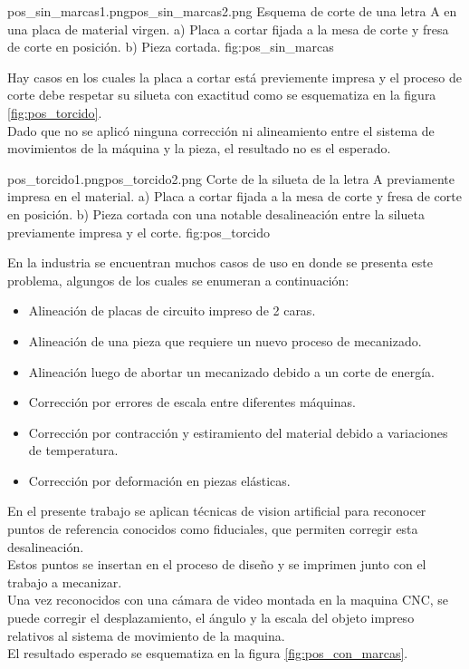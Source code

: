          {pos_sin_marcas1.png}{pos_sin_marcas2.png}
         {Esquema de corte de una letra A en una placa de material virgen. a) Placa a cortar fijada a la mesa de corte y fresa de corte en posición. b) Pieza cortada.}
         {fig:pos_sin_marcas}

         Hay casos en los cuales la placa a cortar está previemente impresa y el proceso de corte debe respetar su silueta con exactitud como se esquematiza en la figura \ref{fig:pos_torcido}. \\
         Dado que no se aplicó ninguna corrección ni alineamiento entre el sistema de movimientos de la máquina y la pieza, el resultado no es el esperado.

         {pos_torcido1.png}{pos_torcido2.png}
         {Corte de la silueta de la letra A previamente impresa en el material. a) Placa a cortar fijada a la mesa de corte y fresa de corte en posición. b) Pieza cortada con una notable desalineación entre la silueta previamente impresa y el corte.}
         {fig:pos_torcido}

         En la industria se encuentran muchos casos de uso en donde se presenta este problema, algungos de los cuales se enumeran a continuación:
\begin{itemize}
   \item{Alineación de placas de circuito impreso de 2 caras.}
   \item{Alineación de una pieza que requiere un nuevo proceso de mecanizado.}
   \item{Alineación luego de abortar un mecanizado debido a un corte de energía.}
   \item{Corrección por errores de escala entre diferentes máquinas.}
   \item{Corrección por contracción y estiramiento del material debido a variaciones de temperatura.}
   \item{Corrección por deformación en piezas elásticas.}
\end{itemize}

         En el presente trabajo se aplican técnicas de vision artificial para reconocer puntos de referencia conocidos como fiduciales, que permiten corregir esta desalineación. \\
         Estos puntos se insertan en el proceso de diseño y se imprimen junto con el trabajo a mecanizar.\\ 
         Una vez reconocidos con una cámara de video montada en la maquina CNC, se puede corregir el desplazamiento, el ángulo y la escala del objeto impreso relativos al sistema de movimiento de la maquina.\\
         El resultado esperado se esquematiza en la figura \ref{fig:pos_con_marcas}.

